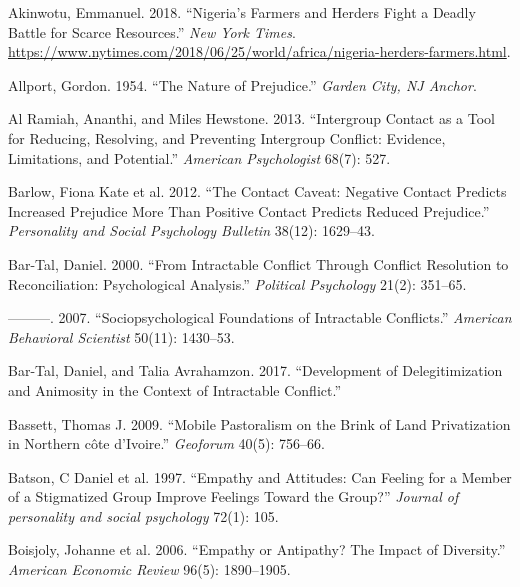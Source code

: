 \documentclass[11pt]{article}
\begin{document}
\hypertarget{refs}{}
\begin{cslreferences}
\leavevmode\hypertarget{ref-nyt2018nigeria}{}%
Akinwotu, Emmanuel. 2018. ``Nigeria's Farmers and Herders Fight a Deadly
Battle for Scarce Resources.'' \emph{New York Times}.
\url{https://www.nytimes.com/2018/06/25/world/africa/nigeria-herders-farmers.html}.

\leavevmode\hypertarget{ref-allport1954prejudice}{}%
Allport, Gordon. 1954. ``The Nature of Prejudice.'' \emph{Garden City,
NJ Anchor}.

\leavevmode\hypertarget{ref-al2013intergroup}{}%
Al Ramiah, Ananthi, and Miles Hewstone. 2013. ``Intergroup Contact as a
Tool for Reducing, Resolving, and Preventing Intergroup Conflict:
Evidence, Limitations, and Potential.'' \emph{American Psychologist}
68(7): 527.

\leavevmode\hypertarget{ref-barlow2012contact}{}%
Barlow, Fiona Kate et al. 2012. ``The Contact Caveat: Negative Contact
Predicts Increased Prejudice More Than Positive Contact Predicts Reduced
Prejudice.'' \emph{Personality and Social Psychology Bulletin} 38(12):
1629--43.

\leavevmode\hypertarget{ref-bar2000intractable}{}%
Bar-Tal, Daniel. 2000. ``From Intractable Conflict Through Conflict
Resolution to Reconciliation: Psychological Analysis.'' \emph{Political
Psychology} 21(2): 351--65.

\leavevmode\hypertarget{ref-bar2007sociopsychological}{}%
---------. 2007. ``Sociopsychological Foundations of Intractable
Conflicts.'' \emph{American Behavioral Scientist} 50(11): 1430--53.

\leavevmode\hypertarget{ref-bar2017development}{}%
Bar-Tal, Daniel, and Talia Avrahamzon. 2017. ``Development of
Delegitimization and Animosity in the Context of Intractable Conflict.''

\leavevmode\hypertarget{ref-bassett2009mobile}{}%
Bassett, Thomas J. 2009. ``Mobile Pastoralism on the Brink of Land
Privatization in Northern côte d'Ivoire.'' \emph{Geoforum} 40(5):
756--66.

\leavevmode\hypertarget{ref-batson1997empathy}{}%
Batson, C Daniel et al. 1997. ``Empathy and Attitudes: Can Feeling for a
Member of a Stigmatized Group Improve Feelings Toward the Group?''
\emph{Journal of personality and social psychology} 72(1): 105.

\leavevmode\hypertarget{ref-boisjoly2006empathy}{}%
Boisjoly, Johanne et al. 2006. ``Empathy or Antipathy? The Impact of
Diversity.'' \emph{American Economic Review} 96(5): 1890--1905.


\end{cslreferences}
\end{document}
